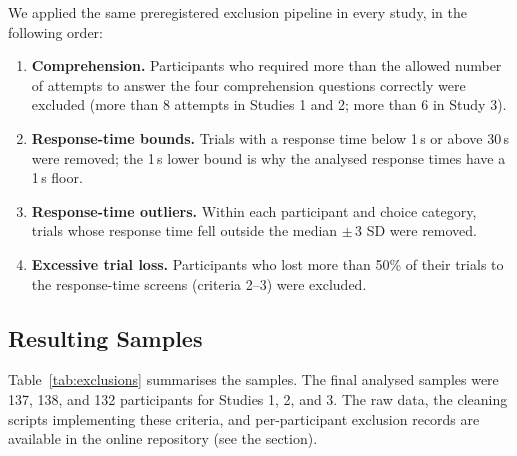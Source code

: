\documentclass[man,floatsintext]{apa7}
\begin{document}
We applied the same preregistered exclusion pipeline in every study, in the following order:
\begin{enumerate}
    \item \textbf{Comprehension.} Participants who required more than the allowed number of attempts to answer the four comprehension questions correctly were excluded (more than 8 attempts in Studies 1 and 2; more than 6 in Study 3).
    \item \textbf{Response-time bounds.} Trials with a response time below 1\,s or above 30\,s were removed; the 1\,s lower bound is why the analysed response times have a 1\,s floor.
    \item \textbf{Response-time outliers.} Within each participant and choice category, trials whose response time fell outside the median $\pm\,3$ SD were removed.
    \item \textbf{Excessive trial loss.} Participants who lost more than 50\% of their trials to the response-time screens (criteria 2--3) were excluded.
\end{enumerate}

\subsection{Resulting Samples}

Table~\ref{tab:exclusions} summarises the samples. The final analysed samples were 137, 138, and 132 participants for Studies 1, 2, and 3. The raw data, the cleaning scripts implementing these criteria, and per-participant exclusion records are available in the online repository (see the  section).
\end{document}
